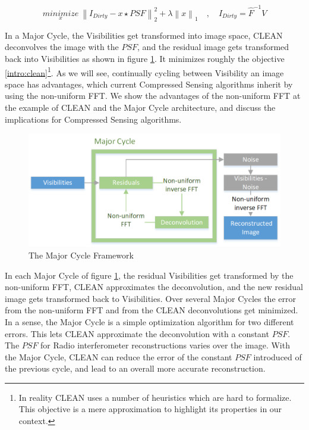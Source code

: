 \begin{equation}\label{intro:clean}
\underset{x}{minimize} \: \left \|  I_{Dirty} - x \star PSF \right \|_2^2 + \lambda \left \| x \right \|_1 \quad, \quad I_{Dirty} = \hat{F}^{-1} V
\end{equation}

In a Major Cycle, the Visibilities get transformed into image space, CLEAN deconvolves the image with the $PSF$, and the residual image gets transformed back into Visibilities as shown in figure \ref{intro:major}. It minimizes roughly the objective \eqref{intro:clean}\footnote{ In reality CLEAN uses a number of heuristics which are hard to formalize. This objective is a mere approximation to highlight its properties in our context.}. As we will see, continually cycling between Visibility an image space has advantages, which current Compressed Sensing algorithms inherit by using the non-uniform FFT. We show the advantages of the non-uniform FFT at the example of CLEAN and the Major Cycle architecture, and discuss the implications for Compressed Sensing algorithms.


\begin{figure}[h]
	\centering
	\includegraphics[width=0.80\linewidth]{./chapters/01.intro/Major-Minor.png}
	\caption{The Major Cycle Framework}
	\label{intro:major}
\end{figure}

In each Major Cycle of figure \ref{intro:major}, the residual Visibilities get transformed by the non-uniform FFT, CLEAN approximates the deconvolution, and the new residual image gets transformed back to Visibilities. Over several Major Cycles the error from the non-uniform FFT and from the CLEAN deconvolutions get minimized. In a sense, the Major Cycle is a simple optimization algorithm for two different errors. This lets CLEAN approximate the deconvolution with a constant $PSF$. The $PSF$ for Radio interferometer reconstructions varies over the image. With the Major Cycle, CLEAN can reduce the error of the constant $PSF$ introduced of the previous cycle, and lead to an overall more accurate reconstruction.

